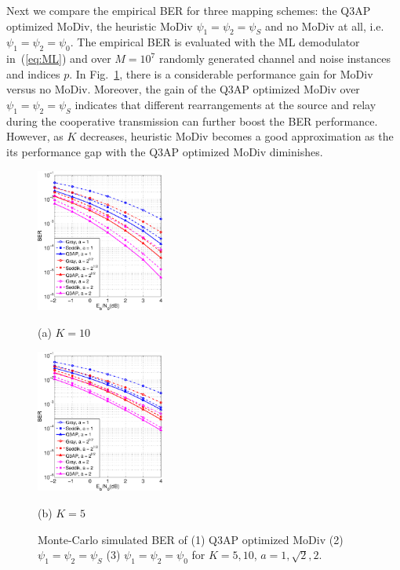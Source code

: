 \documentclass[journal]{IEEEtran}
\begin{document}
Next we compare the empirical BER for three mapping schemes: the Q3AP optimized
MoDiv, the heuristic MoDiv $\psi_1 = \psi_2 = \psi_S$  and no MoDiv at all, i.e.
$\psi_1 = \psi_2 = \psi_0$. The empirical BER is evaluated with the ML
demodulator in~(\ref{eq:ML}) and over $M=10^7$ randomly generated channel and
noise instances and indices $p$. In Fig.~\ref{fig:montecarlo}, there is a
considerable performance gain for MoDiv versus no MoDiv. Moreover, the gain of
the Q3AP optimized MoDiv over $\psi_1 = \psi_2 = \psi_S$ indicates that
different rearrangements at the source and relay during the cooperative
transmission can further boost the BER performance. However, as $K$ decreases,
heuristic MoDiv becomes a good approximation as the its performance gap with the
Q3AP optimized MoDiv diminishes.

\begin{figure}[!t]
    \begin{minipage}[b]{0.49\linewidth}
      \centering
      \centerline{\includegraphics[width=4.2cm]{./figs/MC_10.eps}}
      \centerline{(a) $ K = 10$}\medskip
    \end{minipage}
    \hfill
    \begin{minipage}[b]{0.49\linewidth}
      \centering
      \centerline{\includegraphics[width=4.2cm]{./figs/MC_5.eps}}
      \centerline{(b) $K=5$}\medskip
    \end{minipage}
    \caption{Monte-Carlo simulated BER of (1) Q3AP optimized MoDiv
    (2) $\psi_1 = \psi_2 = \psi_S$ (3) $\psi_1 = \psi_2 = \psi_0$ for $K = 5,
    10$, $a = 1, \sqrt{2}, 2$.}
    \label{fig:montecarlo}
\end{figure}
\end{document}
